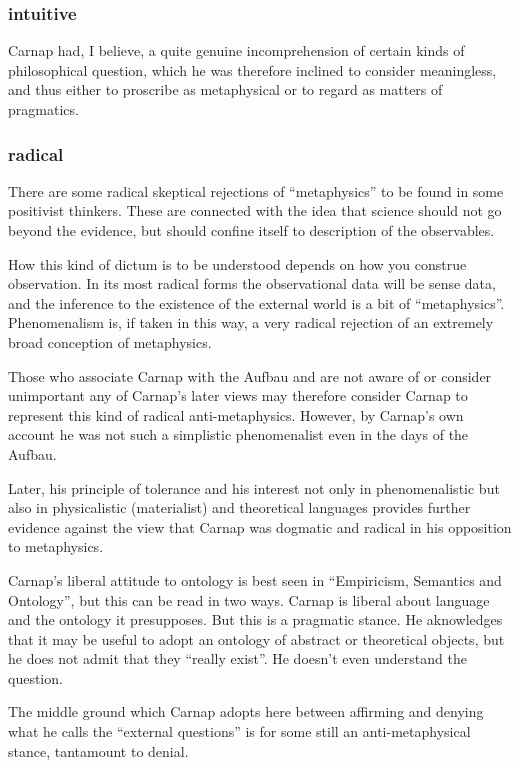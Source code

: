 \documentclass{article}
\begin{document}
\subsubsection{intuitive}
Carnap had, I believe, a quite genuine incomprehension of certain kinds of philosophical question, which he was therefore inclined to consider meaningless, and thus either to proscribe as metaphysical or to regard as matters of pragmatics.

\subsubsection{radical}
There are some radical skeptical rejections of ``metaphysics'' to be found in some positivist thinkers.
These are connected with the idea that science should not go beyond the evidence, but should confine itself to description of the observables.

How this kind of dictum is to be understood depends on how you construe observation.
In its most radical forms the observational data will be sense data, and the inference to the existence of the external world is a bit of ``metaphysics''.
Phenomenalism is, if taken in this way, a very radical rejection of an extremely broad conception of metaphysics.

Those who associate Carnap with the Aufbau and are not aware of or consider unimportant any of Carnap's later views may therefore consider Carnap to represent this kind of radical anti-metaphysics.
However, by Carnap's own account he was not such a simplistic phenomenalist even in the days of the Aufbau.

Later, his principle of tolerance and his interest not only in phenomenalistic but also in physicalistic (materialist) and theoretical languages provides further evidence against the view that Carnap was dogmatic and radical in his opposition to metaphysics.

Carnap's liberal attitude to ontology is best seen in ``Empiricism, Semantics and Ontology'', but this can be read in two ways.
Carnap is liberal about language and the ontology it presupposes.
But this is a pragmatic stance.
He aknowledges that it may be useful to adopt an ontology of abstract or theoretical objects, but he does not admit that they ``really exist''.
He doesn't even understand the question.

The middle ground which Carnap adopts here between affirming and denying what he calls the ``external questions'' is for some still an anti-metaphysical stance, tantamount to denial.
\end{document}
